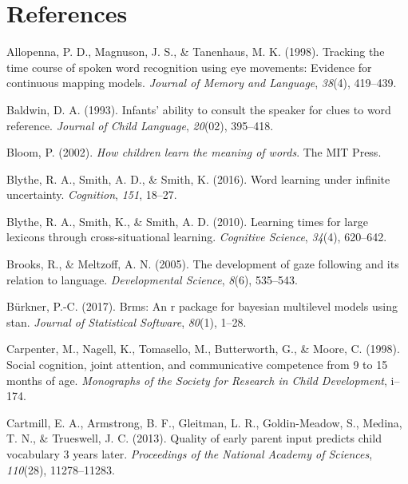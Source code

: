 \documentclass[man,floatsintext]{apa6}
\begin{document}
\newpage

\section{References}\label{references}

\begingroup
\setlength{\parindent}{-0.5in} \setlength{\leftskip}{0.5in}

\hypertarget{refs}{}
\hypertarget{ref-allopenna1998tracking}{}
Allopenna, P. D., Magnuson, J. S., \& Tanenhaus, M. K. (1998). Tracking
the time course of spoken word recognition using eye movements: Evidence
for continuous mapping models. \emph{Journal of Memory and Language},
\emph{38}(4), 419--439.

\hypertarget{ref-baldwin1993infants}{}
Baldwin, D. A. (1993). Infants' ability to consult the speaker for clues
to word reference. \emph{Journal of Child Language}, \emph{20}(02),
395--418.

\hypertarget{ref-bloom2002children}{}
Bloom, P. (2002). \emph{How children learn the meaning of words}. The
MIT Press.

\hypertarget{ref-blythe2016word}{}
Blythe, R. A., Smith, A. D., \& Smith, K. (2016). Word learning under
infinite uncertainty. \emph{Cognition}, \emph{151}, 18--27.

\hypertarget{ref-blythe2010learning}{}
Blythe, R. A., Smith, K., \& Smith, A. D. (2010). Learning times for
large lexicons through cross-situational learning. \emph{Cognitive
Science}, \emph{34}(4), 620--642.

\hypertarget{ref-brooks2005development}{}
Brooks, R., \& Meltzoff, A. N. (2005). The development of gaze following
and its relation to language. \emph{Developmental Science}, \emph{8}(6),
535--543.

\hypertarget{ref-burkner2017brms}{}
Bürkner, P.-C. (2017). Brms: An r package for bayesian multilevel models
using stan. \emph{Journal of Statistical Software}, \emph{80}(1), 1--28.

\hypertarget{ref-carpenter1998social}{}
Carpenter, M., Nagell, K., Tomasello, M., Butterworth, G., \& Moore, C.
(1998). Social cognition, joint attention, and communicative competence
from 9 to 15 months of age. \emph{Monographs of the Society for Research
in Child Development}, i--174.

\hypertarget{ref-cartmill2013quality}{}
Cartmill, E. A., Armstrong, B. F., Gleitman, L. R., Goldin-Meadow, S.,
Medina, T. N., \& Trueswell, J. C. (2013). Quality of early parent input
predicts child vocabulary 3 years later. \emph{Proceedings of the
National Academy of Sciences}, \emph{110}(28), 11278--11283.
\end{document}

